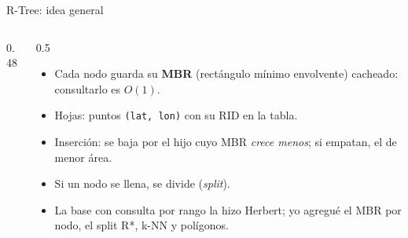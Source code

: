 \documentclass[aspectratio=169,10pt]{beamer}
\begin{document}
\begin{frame}{R-Tree: idea general}
  \begin{columns}[c]
    \begin{column}{0.48\textwidth}
      \centering
    \end{column}
    \begin{column}{0.5\textwidth}
      \begin{itemize}\small
        \item Cada nodo guarda su \textbf{MBR} (rectángulo mínimo envolvente) \alert{cacheado}: consultarlo es $O(1)$.
        \item Hojas: puntos \texttt{(lat, lon)} con su RID en la tabla.
        \item Inserción: se baja por el hijo cuyo MBR \emph{crece menos}; si empatan, el de menor área.
        \item Si un nodo se llena, se divide (\emph{split}).
        \item La base con consulta por rango la hizo Herbert; yo agregué el MBR por nodo, el split R*, k-NN y polígonos.
      \end{itemize}
    \end{column}
  \end{columns}
\end{frame}
\end{document}
